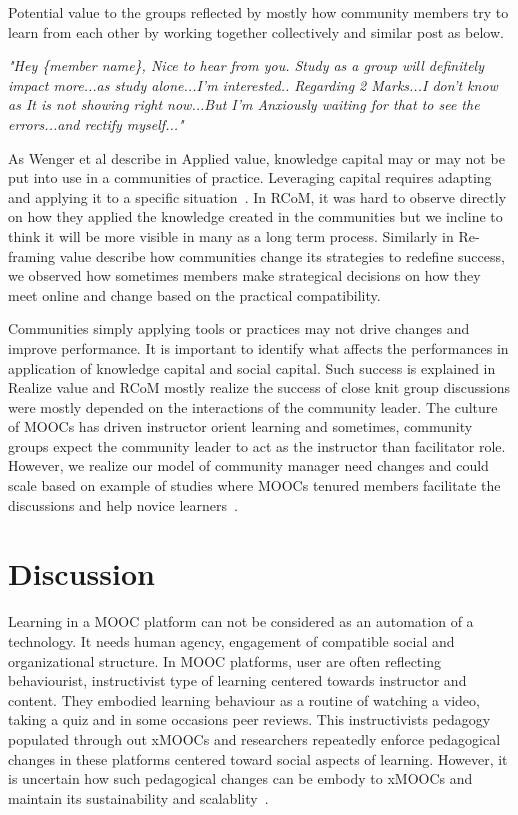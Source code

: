 \documentclass[format=acmsmall, review=false, screen=true]{acmart}
\begin{document}
Potential value to the groups reflected by mostly how community members try to learn from each other by working together collectively and similar post as below. 

\textit{"Hey \{member name\}, Nice to hear from you. Study as a group will definitely impact more...as study alone...I'm interested.. Regarding 2 Marks...I don't know as It is not showing right now...But I'm Anxiously waiting for that to see the errors...and rectify myself..."}

As Wenger et al describe in Applied value, knowledge capital may or may not be put into use in a communities of practice. Leveraging capital requires adapting and applying it to a specific situation~\cite{wenger2011promoting}. In RCoM, it was hard to observe directly on how they applied the knowledge created in the communities but we incline to think it will be more visible in many as a long term process. Similarly in Re-framing value describe how communities change its strategies to redefine success, we observed how sometimes members make strategical decisions on how they meet online and change based on the practical compatibility. 

Communities simply applying tools or practices may not drive changes and improve performance. It is important to identify what affects the performances in application of knowledge capital and social capital. Such success is explained in Realize value and RCoM mostly realize the success of close knit group discussions were mostly depended on the interactions of the community leader. The culture of MOOCs has driven instructor orient learning and sometimes, community groups expect the community leader to act as the instructor than facilitator role. However, we realize our model of community manager need changes and could scale based on example of studies where MOOCs tenured members facilitate the discussions and help novice learners~\cite{nelimarkka2015alumni}. 

\section{Discussion}

Learning in a MOOC platform can not be considered as an automation of a technology. It needs human agency, engagement of compatible social and organizational structure. In MOOC platforms, user are often reflecting behaviourist, instructivist type of learning centered towards instructor and content. They embodied learning behaviour as a routine of watching a video, taking a quiz and in some occasions peer reviews. This instructivists pedagogy populated through out xMOOCs and researchers repeatedly enforce pedagogical changes in these platforms centered toward social aspects of learning. However, it is uncertain how such pedagogical changes can be embody to xMOOCs and maintain its sustainability and scalablity~\cite{law2019sociotechnical,looi2015scaling}. 
\end{document}
